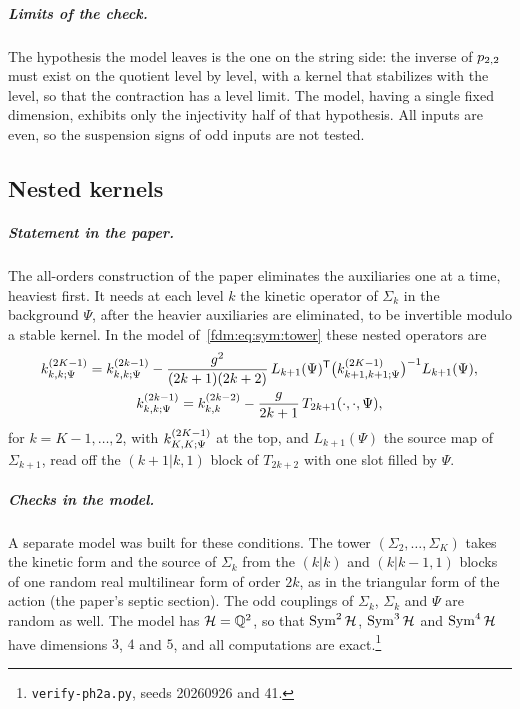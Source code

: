 \subparagraph{Limits of the check.}
The hypothesis the model leaves is the one on the string side: the inverse of $p_{2,2}$ must exist on the quotient level by level, with a kernel that stabilizes with the level, so that the contraction has a level limit.
The model, having a single fixed dimension, exhibits only the injectivity half of that hypothesis.
All inputs are even, so the suspension signs of odd inputs are not tested.

\subsection{Nested kernels}
\label{fdm:sec:nested}

\subparagraph{Statement in the paper.}
The all-orders construction of the paper eliminates the auxiliaries one at a time, heaviest first.
It needs at each level $k$ the kinetic operator of $\Sigma_k$ in the background $\Psi$, after the heavier auxiliaries are eliminated, to be invertible modulo a stable kernel.
In the model of~\eqref{fdm:eq:sym:tower} these nested operators are
\begin{subequations}
  \label{fdm:eq:nested:recursion}
  \begin{gather}
    \kin{k}{\Psi}{2 K - 1}
      = \kin{k}{\Psi}{2 k - 1}
        - \frac{g^2}{(2 k + 1)(2 k + 2)} \, L_{k + 1}(\Psi)^{\mathsf T} \big( \kin{k + 1}{\Psi}{2 K - 1} \big)^{-1} L_{k + 1}(\Psi),
    \\
    \kin{k}{\Psi}{2 k - 1}
      = \kin{k}{}{2 k - 2} - \frac{g}{2 k + 1} \, T_{2k+1}(\cdot, \cdot, \Psi),
  \end{gather}
\end{subequations}
for $k = K - 1, \dots, 2$, with $\kin{K}{\Psi}{2 K - 1}$ at the top, and $L_{k+1}(\Psi)$ the source map of $\Sigma_{k+1}$, read off the $(k + 1 \vert k, 1)$ block of $T_{2k+2}$ with one slot filled by $\Psi$.

\subparagraph{Checks in the model.}
A separate model was built for these conditions.
The tower $(\Sigma_2, \dots, \Sigma_K)$ takes the kinetic form and the source of $\Sigma_k$ from the $(k \vert k)$ and $(k \vert k-1, 1)$ blocks of one random real multilinear form of order $2k$, as in the triangular form of the action (the paper's septic section).
The odd couplings of $\Sigma_k$, $\Sigma_k$ and $\Psi$ are random as well.
The model has $\mathcal{H} = \mathbb Q^2$, so that $\operatorname{Sym}^2 \mathcal{H}$, $\operatorname{Sym}^3 \mathcal{H}$ and $\operatorname{Sym}^4 \mathcal{H}$ have dimensions $3$, $4$ and $5$, and all computations are exact.\footnote{\texttt{verify-ph2a.py}, seeds 20260926 and 41.}

